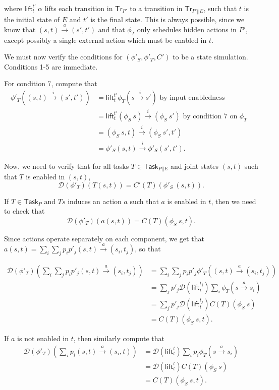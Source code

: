 \documentclass{article}
\newcommand{\Tr}{\mathsf{Tr}}
\newcommand{\Task}{\mathsf{Task}}
\newcommand{\D}{\mathcal{D}}
\begin{document}
where $\mathsf{lift}_t^{t'}\ \alpha$ lifts each transition in $\Tr_{P'}$ to a transition in $\Tr_{P' || E}$, such that $t$ is the initial state of $E$ and $t'$ is the final state. This is always possible, since we know that $(s,t) \xrightarrow{a} (s', t')$ and that $\phi_T$ only schedules hidden actions in $P'$, except possibly a single external action which must be enabled in $t$.

We must now verify the conditions for $(\phi'_S, \phi'_T, C')$ to be a state simulation. Conditions 1-5 are immediate. 

For condition 7, compute that
\begin{align*}
    \phi'_T ((s,t) \xrightarrow{i} (s',t')) &= \mathsf{lift}_t^{t'} \phi_T (s \xrightarrow{i} s') \text{ by input enabledness } \\
     &= \mathsf{lift}_t^{t'} (\phi_S\ s) \xrightarrow{i} (\phi_S\ s') \text{ by condition 7 on $\phi_T$ } \\
     &= (\phi_S\ s, t) \xrightarrow{i} (\phi_S\ s', t') \\
     &= \phi'_S (s,t) \xrightarrow{i} \phi'_S (s', t').
 \end{align*}

Now, we need to verify that for all tasks $T \in \Task_{P || E}$ and joint states $(s,t)$ such that $T$ is enabled in $(s,t)$, 
\[\D(\phi'_T)(T(s,t)) = C'(T) (\phi'_S\ (s,t)).\]

If $T \in \Task_P$ and $Ts$ induces an action $a$ such that $a$ is enabled in $t$, then we need to check that
\[\D(\phi'_T)(a (s,t)) = C(T) (\phi_S\ s, t).\]

Since actions operate separately on each component, we get that $a (s,t) = \sum_i \sum_j p_i p'_j (s,t) \xrightarrow{a} (s_i, t_j)$, so that

\begin{align*}
    \D(\phi'_T)(\sum_i \sum_j p_i p'_j (s,t) \xrightarrow{a} (s_i, t_j)) &=
         \sum_i \sum_j p_i p'_j \phi'_T ((s,t) \xrightarrow{a} (s_i, t_j)) \\
      &= \sum_j p'_j \D(\mathsf{lift}_t^{t_j}) \sum_i \phi_T (s \xrightarrow{a} s_i) \\
      &= \sum_j p'_j \D(\mathsf{lift}_t^{t_j}) C(T) (\phi_S\ s) \\
      &= C(T) (\phi_S\ s, t).
\end{align*}

If $a$ is not enabled in $t$, then similarly compute that
\begin{align*}
    \D(\phi'_T)(\sum_i p_i (s,t) \xrightarrow{a} (s_i, t)) &=
      \D(\mathsf{lift}_t^{t}) \sum_i p_i \phi_T (s \xrightarrow{a} s_i) \\
      &= \D(\mathsf{lift}_t^{t}) C(T) (\phi_S\ s) \\
      &= C(T) (\phi_S\ s, t).
\end{align*}
\end{document}
